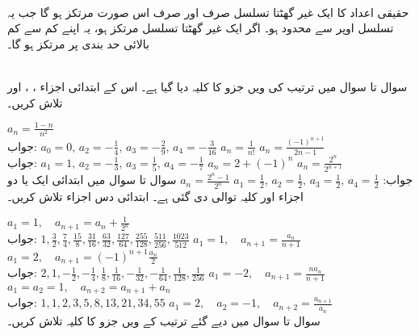 \\
حقیقی اعداد کا ایک غیر گھٹتا تسلسل صرف اور صرف اس صورت مرتکز ہو گا جب یہ تسلسل اوپر سے محدود ہو۔ اگر ایک غیر گھٹتا تسلسل مرتکز ہو، یہ اپنے کم سے کم بالائی حد بندی پر مرتکز ہو گا۔

\\
سوال  تا سوال  میں ترتیب کی  ویں جزو کا کلیہ دیا گیا ہے۔ اس کے ابتدائی اجزاء ، ،  اور  تلاش کریں۔

$a_n=\frac{1-n}{n^2}$\\
جواب:\quad
$a_0=0,\, a_2=-\tfrac{1}{4},\,a_3=-\tfrac{2}{9},\,a_4=-\tfrac{3}{16}$
$a_n=\frac{1}{n!}$
$a_n=\frac{(-1)^{n+1}}{2n-1}$\\
جواب:\quad
$a_1=1,\,a_2=-\tfrac{1}{3},\,a_3=\tfrac{1}{5},\,a_4=-\tfrac{1}{7}$
$a_n=2+(-1)^n$
$a_n=\frac{2^n}{2^{n+1}}$\\
جواب:\quad
$a_1=\tfrac{1}{2},\,a_2=\tfrac{1}{2},\,a_3=\tfrac{1}{2},\,a_4=\tfrac{1}{2}$
$a_n=\frac{2^n-1}{2^n}$
سوال  تا سوال  میں ابتدائی ایک یا دو اجزاء اور کلیہ توالی دی گئی ہے۔ ابتدائی دس اجزاء تلاش کریں۔

$a_1=1,\quad a_{n+1}=a_n+\frac{1}{2^n}$\\
جواب:\quad
$1,\tfrac{3}{2},\tfrac{7}{4},\tfrac{15}{8},\tfrac{31}{16},\tfrac{63}{32},\tfrac{127}{64},\tfrac{255}{128},\tfrac{511}{256},\tfrac{1023}{512}$
$a_1=1,\quad a_{n+1}=\frac{a_n}{n+1}$
$a_1=2,\quad a_{n+1}=(-1)^{n+1}\frac{a_n}{2}$\\
جواب:\quad
$2,1,-\tfrac{1}{2},-\tfrac{1}{4},\tfrac{1}{8},\tfrac{1}{16},-\tfrac{1}{32},-\tfrac{1}{64},\tfrac{1}{128},\tfrac{1}{256}$
$a_1=-2,\quad a_{n+1}=\frac{na_n}{n+1}$
$a_1=a_2=1,\quad a_{n+2}=a_{n+1}+a_n$\\
جواب:\quad
$1,1,2,3,5,8,13,21,34,55$
$a_1=2,\quad a_2=-1,\quad a_{n+2}=\frac{a_{n+1}}{a_n}$
\\
سوال  تا سوال  میں دیے گئے ترتیب کے  ویں جزو کا کلیہ تلاش کریں۔

